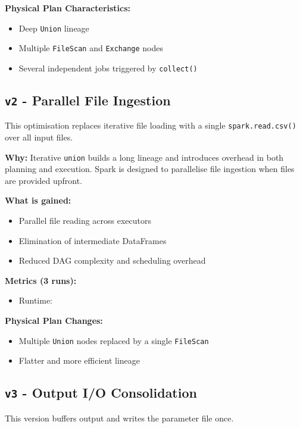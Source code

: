 \documentclass[conference,a4paper]{IEEEtran}
\begin{document}
\textbf{Physical Plan Characteristics:}
\begin{itemize}
    \item Deep \texttt{Union} lineage
    \item Multiple \texttt{FileScan} and \texttt{Exchange} nodes
    \item Several independent jobs triggered by \texttt{collect()}
\end{itemize}

\subsection{\texttt{v2} - Parallel File Ingestion}
\label{sec:v2}

This optimisation replaces iterative file loading with a single
\texttt{spark.read.csv()} over all input files.

\textbf{Why:}
Iterative \texttt{union} builds a long lineage and introduces overhead in both
planning and execution. Spark is designed to parallelise file ingestion when
files are provided upfront.

\textbf{What is gained:}
\begin{itemize}
    \item Parallel file reading across executors
    \item Elimination of intermediate DataFrames
    \item Reduced DAG complexity and scheduling overhead
\end{itemize}

\textbf{Metrics (3 runs):}
\begin{itemize}
    \item Runtime: \texttt{}
\end{itemize}

\textbf{Physical Plan Changes:}
\begin{itemize}
    \item Multiple \texttt{Union} nodes replaced by a single \texttt{FileScan}
    \item Flatter and more efficient lineage
\end{itemize}

\subsection{\texttt{v3} - Output I/O Consolidation}
\label{sec:v3}

This version buffers output and writes the parameter file once.
\end{document}
